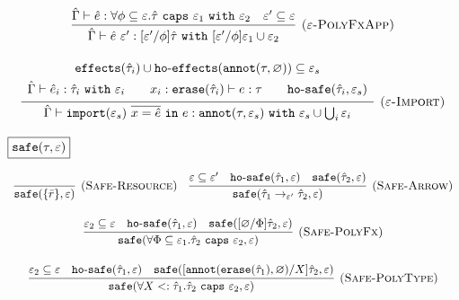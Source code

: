 \documentclass{llncs}
\newcommand{\keywadj}[1]{\mathtt{#1}}
\newcommand{\keyw}[1]{\keywadj{#1}~}
\newcommand{\kw}[1]{\keyw{ #1 }}
\newcommand{\kwa}[1]{\keywadj{ #1 }}
\newcommand{\hyphen}{\hbox{-}}
\newcommand{\hofx}[1]{ \kwa{ho \hyphen effects}(#1) }
\newcommand{\safe}[2]{ \kwa{safe}(#1, #2) }
\newcommand{\hosafe}[2]{ \kwa{ho \hyphen safe}(#1, #2) }
\newcommand{\annot}[2]{
	\keywadj{annot}(#1, #2)
}
\newcommand{\erase}[1]{
	\keywadj{erase}(#1)
}
\newcommand{\polycap}[3]{
	\forall #1. #2~ \kw{caps} #3
}
\begin{document}
\[\begin{array}{c}
\infer[\textsc{($\varepsilon$-PolyFxApp)}]
	{ \hat \Gamma \vdash \hat e~\varepsilon' : [\varepsilon'/\phi]\hat \tau~\kw{with} [\varepsilon'/\phi]\varepsilon_1 \cup \varepsilon_2 }
	{ \hat \Gamma \vdash \hat e: \polycap{\phi \subseteq \varepsilon}{\hat \tau}{\varepsilon_1}~\kw{with} \varepsilon_2 & \varepsilon' \subseteq \varepsilon } \\[2ex]

\infer[\textsc{($\varepsilon$-Import)}]
	{ \hat \Gamma \vdash \kwa{import}(\varepsilon_s)~\overline{x = \hat e}~\kw{in} e: \kwa{annot}(\tau, \varepsilon_s)~\kw{with} \varepsilon_s \cup \bigcup_{i} \varepsilon_i }
{{\def\arraystretch{1.4}
  \begin{array}{c}
\kwa{effects}(\hat \tau_i) \cup \hofx{\annot{\tau}{\varnothing}}\subseteq \varepsilon_s \\
\hat \Gamma \vdash \hat e_i: \hat \tau_i~\kw{with} \varepsilon_i  ~~~~~~ x_i: \kwa{erase}(\hat \tau_i) \vdash e: \tau ~~~~~~ \hosafe{\hat \tau_i}{\varepsilon_s}
  \end{array}}} 
 
 
\end{array}
\]





\noindent
$\fbox{$\kwa{safe(\tau, \varepsilon)}$}$

\[
\begin{array}{c}

\infer[\textsc{(Safe-Resource)}]
	{\kwa{safe}(\{ \bar r \}, \varepsilon)}
	{}
~~~
\infer[\textsc{(Safe-Arrow)}]
	{\kwa{safe}(\hat \tau_1 \rightarrow_{\varepsilon'} \hat \tau_2, \varepsilon)}
	{\varepsilon \subseteq \varepsilon' & \kwa{ho \hyphen safe}(\hat \tau_1, \varepsilon) & \kwa{safe}(\hat \tau_2, \varepsilon)} \\[3ex]

\infer[\textsc{(Safe-PolyFx)}]
	{\safe{\forall \Phi \subseteq \varepsilon_1. \hat \tau_2~\kw{caps} \varepsilon_2}{\varepsilon} }
	{\varepsilon_2 \subseteq \varepsilon & \hosafe{\hat \tau_1}{\varepsilon} & \safe{[\varnothing/\Phi]\hat \tau_2}{\varepsilon}} \\[3ex]

\infer[\textsc{(Safe-PolyType)}]
	{\safe{\polycap{X <: \hat \tau_1}{\hat \tau_2}{\varepsilon_2}}{\varepsilon}}
	{\varepsilon_2 \subseteq \varepsilon & \hosafe{\hat \tau_1}{\varepsilon} & \safe{[\annot{\erase{\hat \tau_1}}{\varnothing}/X]\hat \tau_2}{\varepsilon}}

\end{array}
\]
\end{document}

